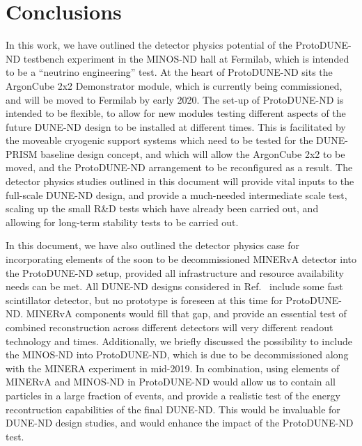 \section{Conclusions}
\label{sec:conclusions}

In this work, we have outlined the detector physics potential of the ProtoDUNE-ND testbench experiment in the MINOS-ND hall at Fermilab, which is intended to be a ``neutrino engineering'' test. At the heart of ProtoDUNE-ND sits the ArgonCube 2x2 Demonstrator module, which is currently being commissioned, and will be moved to Fermilab by early 2020. The set-up of ProtoDUNE-ND is intended to be flexible, to allow for new modules testing different aspects of the future DUNE-ND design to be installed at different times. This is facilitated by the moveable cryogenic support systems which need to be tested for the DUNE-PRISM baseline design concept, and which will allow the ArgonCube 2x2 to be moved, and the ProtoDUNE-ND arrangement to be reconfigured as a result. The detector physics studies outlined in this document will provide vital inputs to the full-scale DUNE-ND design, and provide a much-needed intermediate scale test, scaling up the small R\&D tests which have already been carried out, and allowing for long-term stability tests to be carried out.

In this document, we have also outlined the detector physics case for incorporating elements of the soon to be decommissioned MINERvA detector into the ProtoDUNE-ND setup, provided all infrastructure and resource availability needs can be met. All DUNE-ND designs considered in Ref.~\cite{dune_ndcsg} include some fast scintillator detector, but no prototype is foreseen at this time for ProtoDUNE-ND. MINERvA components would fill that gap, and provide an essential test of combined reconstruction across different detectors will very different readout technology and times. Additionally, we briefly discussed the possibility to include the MINOS-ND into ProtoDUNE-ND, which is due to be decommissioned along with the MINERA experiment in mid-2019. In combination, using elements of MINERvA and MINOS-ND in ProtoDUNE-ND would allow us to contain all particles in a large fraction of events, and provide a realistic test of the energy recontruction capabilities of the final DUNE-ND. This would be invaluable for DUNE-ND design studies, and would enhance the impact of the ProtoDUNE-ND test.
